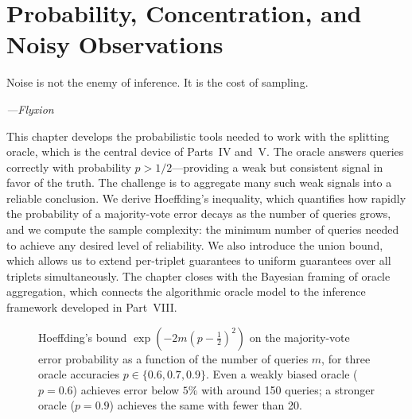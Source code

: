 \chapter{Probability, Concentration, and Noisy Observations}
\label{ch:probability}

\epigraph{%
  Noise is not the enemy of inference. It is the cost of sampling.%
}{\textit{---Flyxion}}

This chapter develops the probabilistic tools needed to work with the splitting oracle, which is the central device of Parts~IV and~V. The oracle answers queries correctly with probability $p > 1/2$---providing a weak but consistent signal in favor of the truth. The challenge is to aggregate many such weak signals into a reliable conclusion. We derive Hoeffding's inequality, which quantifies how rapidly the probability of a majority-vote error decays as the number of queries grows, and we compute the sample complexity: the minimum number of queries needed to achieve any desired level of reliability. We also introduce the union bound, which allows us to extend per-triplet guarantees to uniform guarantees over all triplets simultaneously. The chapter closes with the Bayesian framing of oracle aggregation, which connects the algorithmic oracle model to the inference framework developed in Part~VIII.

\begin{figure}[ht]
\centering
{}
\caption{Hoeffding's bound $\exp(-2m(p-\frac{1}{2})^2)$ on the majority-vote error probability as a function of the number of queries $m$, for three oracle accuracies $p \in \{0.6, 0.7, 0.9\}$. Even a weakly biased oracle ($p=0.6$) achieves error below $5\%$ with around 150 queries; a stronger oracle ($p=0.9$) achieves the same with fewer than 20.}
\label{fig:hoeffding}
\end{figure}

